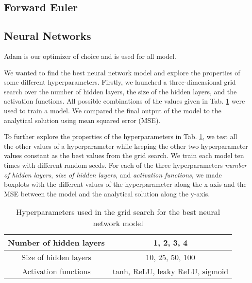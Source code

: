 \subsection{Forward Euler}

\subsection{Neural Networks}

Adam is our optimizer of choice and is used for all model. 



We wanted to find the best neural network model and explore the properties of some different hyperparameters. 
Firstly, we launched a three-dimensional grid search over the number of hidden layers, the size of the hidden layers, and the activation functions. 
All possible combinations of the values given in Tab. \ref{tab:hyperparams} were used to train a model. 
We compared the final output of the model to the analytical solution using mean squared error (MSE). 

To further explore the properties of the hyperparameters in Tab. \ref{tab:hyperparams}, we test all the other values of a hyperparameter while keeping the other two hyperparameter values constant as the best values from the grid search. 
We train each model ten times with different random seeds.
For each of the three hyperparameters \textit{number of hidden layers}, \textit{size of hidden layers}, and \textit{activation functions}, we made boxplots with the different values of the hyperparameter along the x-axis and the MSE between the model and the analytical solution along the y-axis. 







\begin{table}[h!]
    \centering
    \begin{tabular}{|c|c|}
    \hline
        Number of hidden layers & 1, 2, 3, 4  \\ \hline
        Size of hidden layers & 10, 25, 50, 100 \\\hline
        Activation functions & tanh, ReLU, leaky ReLU, sigmoid \\ \hline
    \end{tabular}
    \caption{Hyperparameters used in the grid search for the best neural network model }
    \label{tab:hyperparams}
\end{table}

